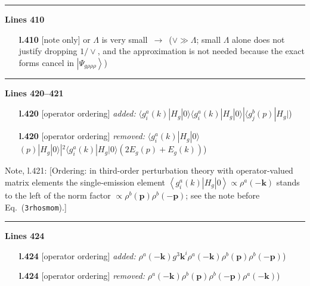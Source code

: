 \documentclass[10pt]{article}
\newenvironment{notebox}{\def\FrameCommand{{\color{notebar}\vrule width 1.5pt}\hspace{6pt}}\MakeFramed{\advance\hsize-\width\FrameRestore}\small}{\endMakeFramed}
\begin{document}
\noindent\rule{\linewidth}{0.3pt}\par\noindent\textbf{Lines 410}\par
\begin{itemize}[leftmargin=2.2em,itemsep=1pt,topsep=2pt]
\item[\textbf{l.410}] \textsf{\small [note only]} or $\Lambda$ is very small\ $\longrightarrow$\ ($\vee\gg\Lambda$; small $\Lambda$ alone does not justify dropping $1/\vee$, and the approximation is not needed because the exact forms cancel in $\left|\Psi_{g\rho\rho\rho}\right\rangle$)
\end{itemize}
\noindent\rule{\linewidth}{0.3pt}\par\noindent\textbf{Lines 420--421} \par
\begin{itemize}[leftmargin=2.2em,itemsep=1pt,topsep=2pt]
\item[\textbf{l.420}] \textsf{\small [operator ordering]} \emph{added:} $\displaystyle \langle g_{i}^{a}(k)|H_{g}|0\rangle$$\displaystyle \langle g_{i}^{a}(k)|H_{g}|0\rangle|\langle g_{j}^{b}(p)|H_{g}|${\color{gray}\small)}
\item[\textbf{l.420}] \textsf{\small [operator ordering]} \emph{removed:} $\displaystyle \langle g_{i}^{a}(k)|H_{g}|0\rangle$$\displaystyle (p)|H_{g}|0\rangle |^{2}\langle g_{i}^{a}(k)|H_{g}|0\rangle (2E_{g}(p)+E_{g}(k))${\color{gray}\small)}
\end{itemize}
\begin{notebox}\textsf{\small Note, l.421:} [Ordering: in third-order perturbation theory with operator-valued matrix elements the single-emission element $\left\langle g_{i}^{a}(k)\left|H_{g}\right|0\right\rangle\propto\rho^a(-\mathbf{k})$ stands to the left of the norm factor $\propto\rho^b(\mathbf{p})\rho^b(-\mathbf{p})$; see the note before Eq.~(\texttt{3rhosmom}).]\end{notebox}
\noindent\rule{\linewidth}{0.3pt}\par\noindent\textbf{Lines 424} \par
\begin{itemize}[leftmargin=2.2em,itemsep=1pt,topsep=2pt]
\item[\textbf{l.424}] \textsf{\small [operator ordering]} \emph{added:} $\displaystyle \rho^{a}(-\mathbf{k})$$\displaystyle g^{3}\mathbf{k}^{i}\rho^{a}(-\mathbf{k})\rho^{b}(\mathbf{p})\rho^{b}(-\mathbf{p})${\color{gray}\small)}
\item[\textbf{l.424}] \textsf{\small [operator ordering]} \emph{removed:} $\displaystyle \rho^{a}(-\mathbf{k})$$\displaystyle \rho^{b}(\mathbf{p})\rho^{b}(-\mathbf{p})\rho^{a}(-\mathbf{k})${\color{gray}\small)}
\end{itemize}
\end{document}
